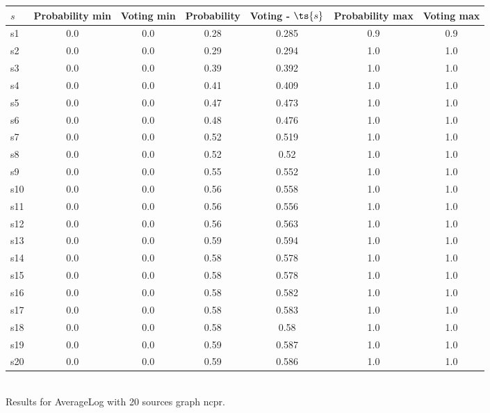\documentclass{article}
\begin{document}
\noindent\begin{tabular}{|l|c|c|c|c|c|c|}
\hline
$s$& Probability min & Voting min & Probability & Voting - $\ts{s}$ & Probability max & Voting max\\
\hline
s1 &0.0 & 0.0 & 0.28 & 0.285 & 0.9 & 0.9\\
\hline
s2 &0.0 & 0.0 & 0.29 & 0.294 & 1.0 & 1.0\\
\hline
s3 &0.0 & 0.0 & 0.39 & 0.392 & 1.0 & 1.0\\
\hline
s4 &0.0 & 0.0 & 0.41 & 0.409 & 1.0 & 1.0\\
\hline
s5 &0.0 & 0.0 & 0.47 & 0.473 & 1.0 & 1.0\\
\hline
s6 &0.0 & 0.0 & 0.48 & 0.476 & 1.0 & 1.0\\
\hline
s7 &0.0 & 0.0 & 0.52 & 0.519 & 1.0 & 1.0\\
\hline
s8 &0.0 & 0.0 & 0.52 & 0.52 & 1.0 & 1.0\\
\hline
s9 &0.0 & 0.0 & 0.55 & 0.552 & 1.0 & 1.0\\
\hline
s10 &0.0 & 0.0 & 0.56 & 0.558 & 1.0 & 1.0\\
\hline
s11 &0.0 & 0.0 & 0.56 & 0.556 & 1.0 & 1.0\\
\hline
s12 &0.0 & 0.0 & 0.56 & 0.563 & 1.0 & 1.0\\
\hline
s13 &0.0 & 0.0 & 0.59 & 0.594 & 1.0 & 1.0\\
\hline
s14 &0.0 & 0.0 & 0.58 & 0.578 & 1.0 & 1.0\\
\hline
s15 &0.0 & 0.0 & 0.58 & 0.578 & 1.0 & 1.0\\
\hline
s16 &0.0 & 0.0 & 0.58 & 0.582 & 1.0 & 1.0\\
\hline
s17 &0.0 & 0.0 & 0.58 & 0.583 & 1.0 & 1.0\\
\hline
s18 &0.0 & 0.0 & 0.58 & 0.58 & 1.0 & 1.0\\
\hline
s19 &0.0 & 0.0 & 0.59 & 0.587 & 1.0 & 1.0\\
\hline
s20 &0.0 & 0.0 & 0.59 & 0.586 & 1.0 & 1.0\\
\hline
\end{tabular}\\

\noindent Results for AverageLog with 20 sources graph ncpr.
\end{document}

